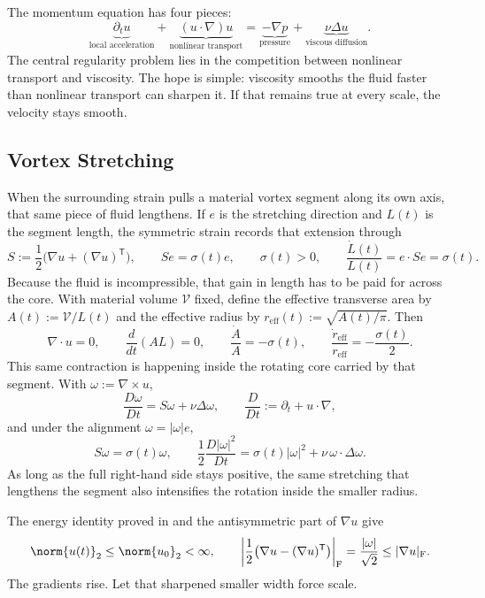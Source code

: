 
The momentum equation has four pieces:
\[
  \underbrace{\partial_t u}_{\text{local acceleration}}
  +
  \underbrace{(u\cdot\nabla)u}_{\text{nonlinear transport}}
  =
  \underbrace{-\nabla p}_{\text{pressure}}
  +
  \underbrace{\nu\Delta u}_{\text{viscous diffusion}}.
\]
The central regularity problem lies in the competition between nonlinear transport and viscosity.
The hope is simple: viscosity smooths the fluid faster than nonlinear transport can sharpen it.
If that remains true at every scale, the velocity stays smooth.

\subsection{Vortex Stretching}\label{sub:ThePerfectlyStretchingVortex}

When the surrounding strain pulls a material vortex segment along its own axis, that same piece of fluid lengthens. If \(e\) is the stretching direction and \(L(t)\) is the segment length, the symmetric strain records that extension through
\[
  S:=\frac12\bigl(\nabla u+(\nabla u)^{\mathsf T}\bigr),
  \qquad
  Se=\sigma(t)e,
  \qquad
  \sigma(t)>0,
  \qquad
  \frac{\dot L(t)}{L(t)}
  =
  e\cdot Se
  =
  \sigma(t).
\]
Because the fluid is incompressible, that gain in length has to be paid for across the core. With material volume \(\mathcal V\) fixed, define the effective transverse area by \(A(t):=\mathcal V/L(t)\) and the effective radius by \(r_{\mathrm{eff}}(t):=\sqrt{A(t)/\pi}\). Then
\[
  \nabla\cdot u=0,
  \qquad
  \frac{d}{dt}(A L)=0,
  \qquad
  \frac{\dot A}{A}=-\sigma(t),
  \qquad
  \frac{\dot r_{\mathrm{eff}}}{r_{\mathrm{eff}}}
  =
  -\frac{\sigma(t)}{2}.
\]
This same contraction is happening inside the rotating core carried by that segment. With \(\omega:=\nabla\times u\),
\[
  \frac{D\omega}{Dt}
  =
  S\omega+\nu\Delta\omega,
  \qquad
  \frac{D}{Dt}
  :=
  \partial_t+u\cdot\nabla,
\]
and under the alignment \(\omega=|\omega|e\),
\[
  S\omega
  =
  \sigma(t)\omega,
  \qquad
  \frac12\frac{D|\omega|^2}{Dt}
  =
  \sigma(t)|\omega|^2
  +
  \nu\,\omega\cdot\Delta\omega.
\]
As long as the full right-hand side stays positive, the same stretching that lengthens the segment also intensifies the rotation inside the smaller radius.

The energy identity proved in  and the antisymmetric part of \(\nabla u\) give
\[
  \norm{u(t)}_2
  \leq
  \norm{u_0}_2
  <\infty,
  \qquad
  \left|\frac12\bigl(\nabla u-(\nabla u)^{\mathsf T}\bigr)\right|_{\mathrm F}
  =
  \frac{|\omega|}{\sqrt2}
  \leq
  |\nabla u|_{\mathrm F}.
\]
The gradients rise. Let that sharpened smaller width force scale.

